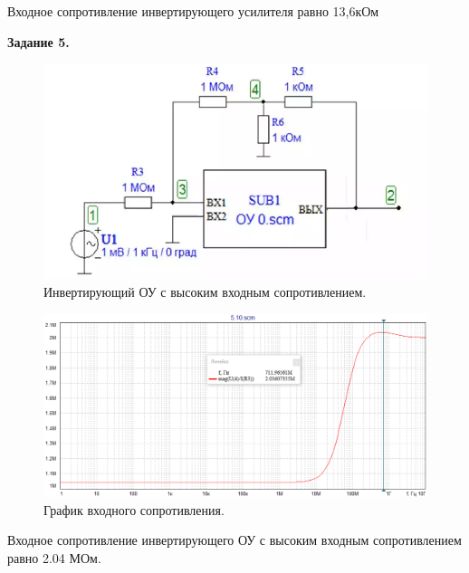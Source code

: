 \documentclass[a4paper,14pt]{extarticle}
\begin{document}
    Входное сопротивление инвертирующего усилителя равно 13,6кОм

    \begin{center}
        \textbf{Задание 5.}
    \end{center}
    \vspace{-0.5cm}
    \begin{figure}[h!]
        \begin{center}
            \includegraphics[scale=0.4]{11.png}
        \end{center}
        \vspace{-0.7cm}
        \caption{Инвертирующий ОУ с высоким входным сопротивлением.}
    \end{figure}
    \vspace{-0.7cm}
    \begin{figure}[h!]
        \begin{center}
            \includegraphics[scale=0.5]{12.png}
        \end{center}
        \vspace{-0.7cm}
        \caption{График входного сопротивления.}
    \end{figure}

    Входное сопротивление инвертирующего ОУ с высоким входным сопротивлением равно 2.04 МОм.
\end{document}
